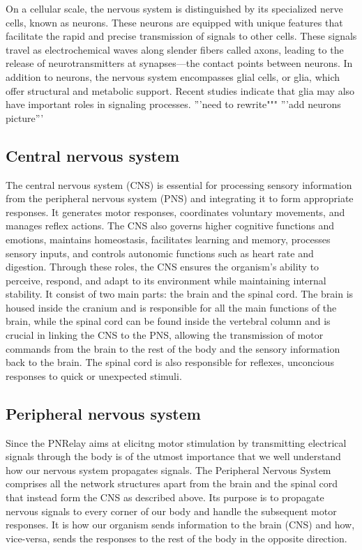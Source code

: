 \documentclass{Configuration_Files/PoliMi3i_thesis}
\begin{document}
On a cellular scale, the nervous system is distinguished by its specialized nerve cells, known as neurons. These neurons are equipped with unique features that facilitate the rapid and precise transmission of signals to other cells. These signals travel as electrochemical waves along slender fibers called axons, leading to the release of neurotransmitters at synapses—the contact points between neurons. In addition to neurons, the nervous system encompasses glial cells, or glia, which offer structural and metabolic support. Recent studies indicate that glia may also have important roles in signaling processes.
'''need to rewrite"""
'''add neurons picture'''

\subsection{Central nervous system}

The central nervous system (CNS) is essential for processing sensory information from the peripheral nervous system (PNS) and integrating it to form appropriate responses. It generates motor responses, coordinates voluntary movements, and manages reflex actions. The CNS also governs higher cognitive functions and emotions, maintains homeostasis, facilitates learning and memory, processes sensory inputs, and controls autonomic functions such as heart rate and digestion. Through these roles, the CNS ensures the organism's ability to perceive, respond, and adapt to its environment while maintaining internal stability.
It consist of two main parts: the brain and the spinal cord.
The brain is housed inside the cranium and is responsible for all the main functions of the brain, while the spinal cord can be found inside the vertebral column and is crucial in linking the CNS to the PNS, allowing the transmission of motor commands from the brain to the rest of the body and the sensory information back to the brain.
The spinal cord is also responsible for reflexes, unconcious responses to quick or unexpected stimuli.


\subsection{Peripheral nervous system}

Since the PNRelay aims at elicitng motor stimulation by transmitting electrical signals through the body is of the utmost importance that we well understand how our nervous system propagates signals.
The Peripheral Nervous System comprises all the network structures apart from the brain and the spinal cord that instead form the CNS as described above.
Its purpose is to propagate nervous signals to every corner of our body and handle the subsequent motor responses.
It is how our organism sends information to the brain (CNS) and how, vice-versa, sends the responses to the rest of the body in the opposite direction.
\end{document}
